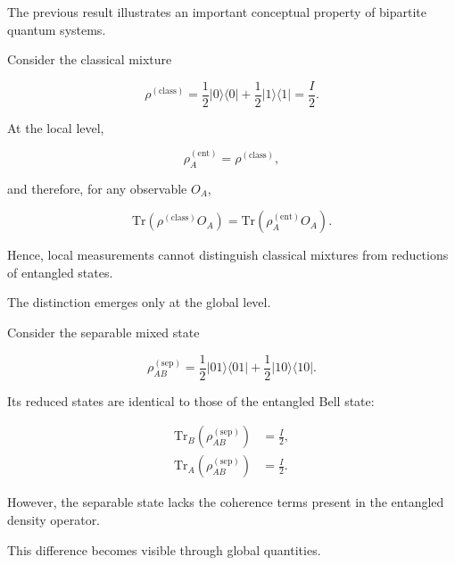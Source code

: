 The previous result illustrates an important conceptual property of bipartite quantum systems.

\medskip

Consider the classical mixture

\begin{equation}
\rho^{(\mathrm{class})}
=
\frac{1}{2}
|0\rangle\langle 0|
+
\frac{1}{2}
|1\rangle\langle 1|
=
\frac{I}{2}.
\label{eq:appendix_classical_mixture}
\end{equation}

At the local level,

\begin{equation}
\rho_A^{(\mathrm{ent})}
=
\rho^{(\mathrm{class})},
\label{eq:appendix_local_equivalence}
\end{equation}

and therefore, for any observable \( O_A \),

\begin{equation}
\mathrm{Tr}
\left(
\rho^{(\mathrm{class})} O_A
\right)
=
\mathrm{Tr}
\left(
\rho_A^{(\mathrm{ent})} O_A
\right).
\label{eq:appendix_local_expectation_equivalence}
\end{equation}

Hence, local measurements cannot distinguish classical mixtures from reductions of entangled states.

\medskip

The distinction emerges only at the global level.

Consider the separable mixed state

\begin{equation}
\rho_{AB}^{(\mathrm{sep})}
=
\frac{1}{2}
|01\rangle\langle 01|
+
\frac{1}{2}
|10\rangle\langle 10|.
\label{eq:appendix_separable_state}
\end{equation}

Its reduced states are identical to those of the entangled Bell state:

\begin{align}
\mathrm{Tr}_B
\left(
\rho_{AB}^{(\mathrm{sep})}
\right)
&=
\frac{I}{2},
\nonumber
\\
\mathrm{Tr}_A
\left(
\rho_{AB}^{(\mathrm{sep})}
\right)
&=
\frac{I}{2}.
\label{eq:appendix_separable_reductions}
\end{align}

However, the separable state lacks the coherence terms present in the entangled density operator.

\medskip

This difference becomes visible through global quantities.

